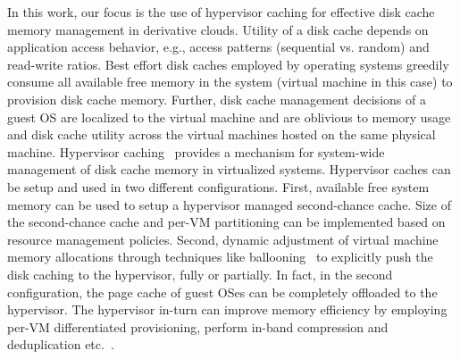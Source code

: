 In this work, our focus is the use of hypervisor caching for
effective disk cache memory management in derivative clouds.
%
%
Utility of a disk cache depends on application access behavior,
e.g., access patterns (sequential vs. random) and read-write ratios.
%
Best effort disk caches employed by operating systems greedily consume
all available free memory in the system (virtual machine in this case) 
to provision disk cache memory.
%
Further, disk cache management decisions of a guest OS are 
localized to the virtual machine and are oblivious to memory 
usage and disk cache utility 
across the virtual machines hosted on the same physical machine.
%
%
Hypervisor caching~\cite{memtrans, oracletmem, kvmzcache, vmmexclusive, singleton} 
provides a mechanism for system-wide management of %
disk cache memory in virtualized systems. 
%
Hypervisor caches can be setup and used 
in two different configurations.
%
First, available free system memory can be used to setup a 
hypervisor managed second-chance cache.
%
Size of the second-chance cache and per-VM partitioning 
can be implemented based on resource management policies.
%
Second, dynamic adjustment of virtual machine memory allocations through
techniques like ballooning~\cite{vmware,hotplug} to explicitly
push the disk caching to the hypervisor, fully or partially.
%
In fact, in the second configuration, the page cache of guest OSes
can be completely offloaded to the hypervisor. 
%
The hypervisor in-turn can improve
memory efficiency by employing per-VM differentiated provisioning,
perform in-band compression and deduplication etc.~\cite{oracletmem,kvmzcache}.
%


